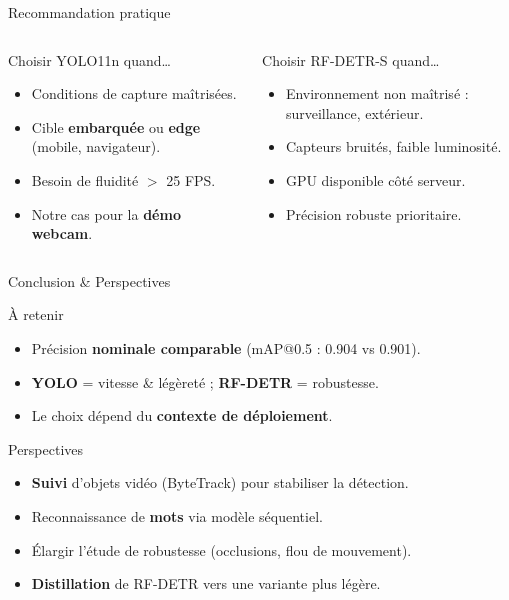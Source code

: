 \documentclass[11pt,aspectratio=169]{beamer}
\begin{document}
\begin{frame}{Recommandation pratique}
  \begin{columns}[T,onlytextwidth]
    \begin{block}{Choisir YOLO11n quand…}
      \begin{itemize}
        \item Conditions de capture maîtrisées.
        \item Cible \textbf{embarquée} ou \textbf{edge} (mobile, navigateur).
        \item Besoin de fluidité $>$ 25 FPS.
        \item Notre cas pour la \textbf{démo webcam}.
      \end{itemize}
    \end{block}

    \begin{block}{Choisir RF-DETR-S quand…}
      \begin{itemize}
        \item Environnement non maîtrisé : surveillance, extérieur.
        \item Capteurs bruités, faible luminosité.
        \item GPU disponible côté serveur.
        \item Précision robuste prioritaire.
      \end{itemize}
    \end{block}
  \end{columns}
\end{frame}

\begin{frame}{Conclusion \& Perspectives}
  \begin{block}{À retenir}
    \begin{itemize}
      \item Précision \textbf{nominale comparable} (mAP@0.5 : 0.904 vs 0.901).
      \item \textbf{YOLO} = vitesse \& légèreté ; \textbf{RF-DETR} = robustesse.
      \item Le choix dépend du \textbf{contexte de déploiement}.
    \end{itemize}
  \end{block}
  \begin{block}{Perspectives}
    \begin{itemize}
      \item \textbf{Suivi} d'objets vidéo (ByteTrack) pour stabiliser la détection.
      \item Reconnaissance de \textbf{mots} via modèle séquentiel.
      \item Élargir l'étude de robustesse (occlusions, flou de mouvement).
      \item \textbf{Distillation} de RF-DETR vers une variante plus légère.
    \end{itemize}
  \end{block}
\end{frame}
\end{document}
